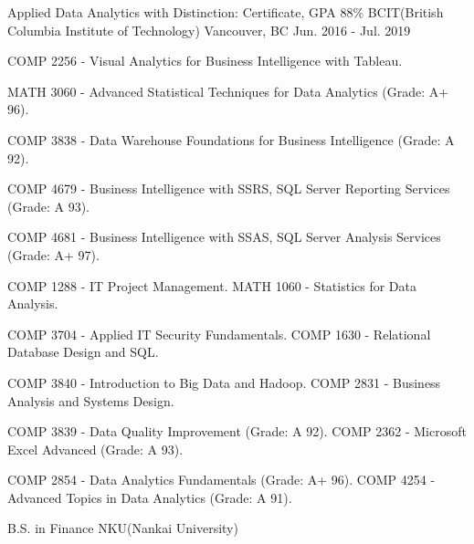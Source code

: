 \documentclass[11pt, a4paper]{awesome-cv}
\begin{document}
\begin{cventries}

  \cventry
    {Applied Data Analytics with Distinction: Certificate, GPA 88\%} %
    {BCIT(British Columbia Institute of Technology)} %
    {Vancouver, BC} %
    {Jun. 2016 - Jul. 2019} %
    {
      \begin{cvitems} %
        \item {COMP 2256 - Visual Analytics for Business Intelligence with Tableau.}
        \item {MATH 3060 - Advanced Statistical Techniques for Data Analytics (Grade: A+ 96).}
        \item {COMP 3838 - Data Warehouse Foundations for Business Intelligence (Grade: A 92).}
        \item {COMP 4679 - Business Intelligence with SSRS, SQL Server Reporting Services (Grade: A 93).}
        \item {COMP 4681 - Business Intelligence with SSAS, SQL Server Analysis Services (Grade: A+ 97).}
        \item {COMP 1288 - IT Project Management. MATH 1060 - Statistics for Data Analysis.}
        \item {COMP 3704 - Applied IT Security Fundamentals. COMP 1630 - Relational Database Design and SQL.}
        \item {COMP 3840 - Introduction to Big Data and Hadoop. COMP 2831 - Business Analysis and Systems Design.}
        \item {COMP 3839 - Data Quality Improvement (Grade: A 92). COMP 2362 - Microsoft Excel Advanced (Grade: A 93).}
        \item {COMP 2854 - Data Analytics Fundamentals (Grade: A+ 96). COMP 4254 - Advanced Topics in Data Analytics (Grade: A 91).}
      \end{cvitems}
    }

\end{cventries}


\begin{cventries}

  \cventry
    {B.S. in Finance} %
    {NKU(Nankai University)} %
    {} %
    {} %
    {
      \begin{cvitems} %
      \end{cvitems}
    }

\end{cventries}


\end{document}
